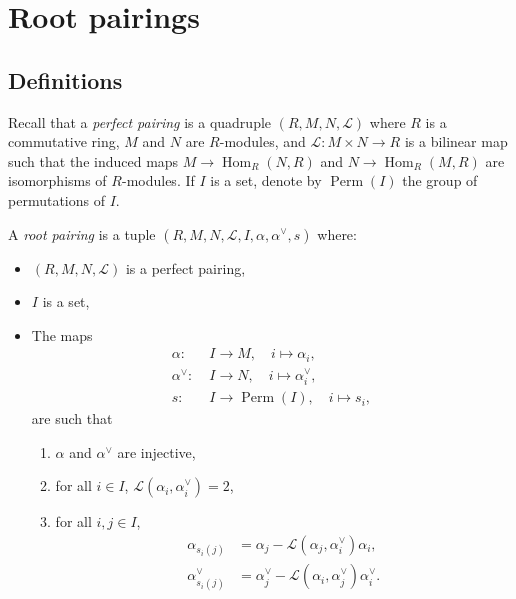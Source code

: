
\chapter{Root pairings}

\section{Definitions}

Recall that a \emph{perfect pairing} is a quadruple $(R,M,N,\mathcal{L})$ where
$R$ is a commutative ring, $M$ and $N$ are $R$-modules, and
$\mathcal{L}:M\times N\to R$ is a bilinear map such that the induced maps
$M\to \operatorname{Hom}_R(N,R)$ and $N\to \operatorname{Hom}_R(M,R)$ are
isomorphisms of $R$-modules. If $I$ is a set, denote by
$\operatorname{Perm}(I)$ the group of permutations of $I$.

\begin{definition}\label{def:root_pairing}
\leanok
A \emph{root pairing} is a tuple
$(R,M,N,\mathcal{L},I,\alpha,\alpha^\vee,s)$ where:
\begin{itemize}
    \item $(R,M,N,\mathcal{L})$ is a perfect pairing,
    \item $I$ is a set,
    \item The maps 
    \begin{align*}
        \alpha:&\; I\to M, \quad i\mapsto \alpha_i, \\
        \alpha^\vee:&\; I\to N, \quad i\mapsto \alpha_i^\vee, \\
        s:&\; I\to \operatorname{Perm}(I), \quad i\mapsto s_i,
    \end{align*}
    are such that
    \begin{enumerate}
    \item $\alpha$ and $\alpha^\vee$ are injective,
    \item for all $i\in I$, $\mathcal{L}(\alpha_i,\alpha_i^\vee)=2$,
    \item for all $i,j\in I$,
    \begin{align*}
        \alpha_{s_i(j)}
            &=\alpha_j-\mathcal{L}(\alpha_j,\alpha_i^\vee)\alpha_i,\\
        \alpha_{s_i(j)}^\vee
            &=\alpha_j^\vee-\mathcal{L}(\alpha_i,\alpha_j^\vee)\alpha_i^\vee.
    \end{align*}
\end{enumerate} 
\end{itemize}

\end{definition}

